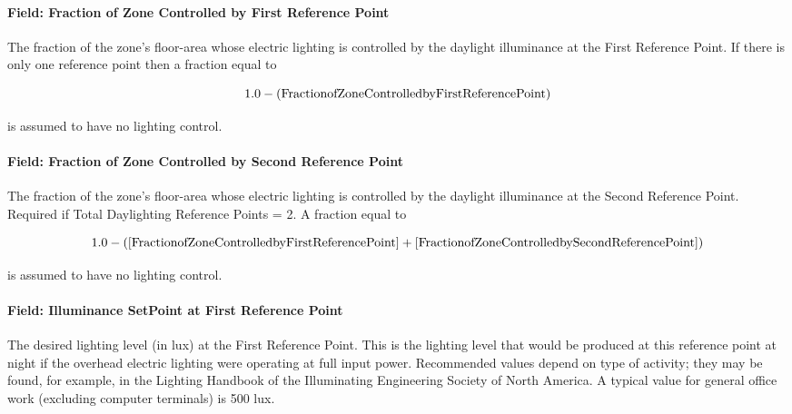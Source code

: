 \paragraph{Field: Fraction of Zone Controlled by First Reference Point}\label{field-fraction-of-zone-controlled-by-first-reference-point}

The fraction of the zone's floor-area whose electric lighting is controlled by the daylight illuminance at the First Reference Point. If there is only one reference point then a fraction equal to

\begin{equation}
  1.0 - (\rm{Fraction of Zone Controlled by First Reference Point})
\end{equation}

is assumed to have no lighting control.

\paragraph{Field: Fraction of Zone Controlled by Second Reference Point}\label{field-fraction-of-zone-controlled-by-second-reference-point}

The fraction of the zone's floor-area whose electric lighting is controlled by the daylight illuminance at the Second Reference Point. Required if Total Daylighting Reference Points = 2. A fraction equal to

\begin{equation}
  1.0 - ([\rm{Fraction of Zone Controlled by First Reference Point}] + [\rm{Fraction of Zone Controlled by Second Reference Point}])
\end{equation}

is assumed to have no lighting control.

\paragraph{Field: Illuminance SetPoint at First Reference Point}\label{field-illuminance-setpoint-at-first-reference-point}

The desired lighting level (in lux) at the First Reference Point. This is the lighting level that would be produced at this reference point at night if the overhead electric lighting were operating at full input power. Recommended values depend on type of activity; they may be found, for example, in the Lighting Handbook of the Illuminating Engineering Society of North America. A typical value for general office work (excluding computer terminals) is 500 lux.

